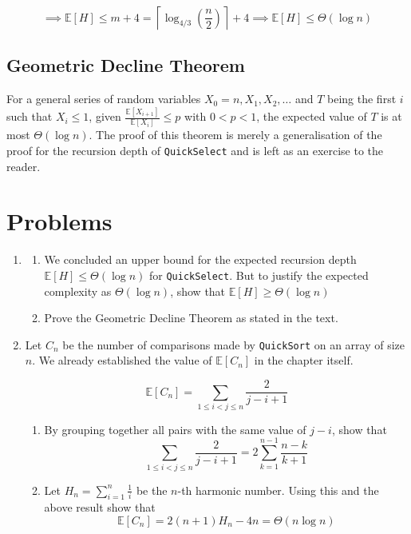\[
\implies
\mathbb E[H]
\le
m+4
=
\left\lceil
\log_{4/3}\!\left(\frac n2\right)
\right\rceil
+4
\implies
\mathbb E[H] \le \Theta(\log n)
\]

\subsection{Geometric Decline Theorem}
For a general series of random variables $X_0=n, X_1, X_2, \ldots$ and $T$ being the first 
$i$ such that $X_i \le 1$, given $\frac{\mathbb E[X_{i+1}]}{\mathbb E[X_{i}]} \le p$ 
with $0<p<1$, the expected value of $T$ is at most $\Theta(\log n)$. The proof of this theorem is merely a 
generalisation of the proof for the recursion depth of \texttt{QuickSelect} and is left as an 
exercise to the reader.

\clearpage
\section{Problems}

\begin{enumerate}
\item[\textbf{1}]
\begin{enumerate}[label=\textbf{(\alph*)}]

\item We concluded an upper bound for the expected recursion depth $\mathbb E[H] \le \Theta(\log n)$ 
for \texttt{QuickSelect}. But to justify the expected complexity as $\Theta(\log n)$, 
show that $\mathbb E[H] \ge \Theta(\log n)$

\item Prove the Geometric Decline Theorem as stated in the text.

\end{enumerate}

\item[\textbf{2}]
Let $C_n$ be the number of comparisons made by \texttt{QuickSort} on an array of size \(n\). 
We already established the value of $\mathbb E[C_n]$ in the chapter itself.

\[
\mathbb E[C_n]=\sum\limits_{1 \le i < j \le n} \frac{2}{j-i+1}
\]

\begin{enumerate}[label=\textbf{(\alph*)}]
\item By grouping together all pairs with the same value of \(j-i\), show that
\[
\sum\limits_{1 \le i < j \le n} \frac{2}{j-i+1}
=
2\sum_{k=1}^{n-1}
\frac{n-k}{k+1}
\]

\item Let $H_n=\sum_{i=1}^{n}\frac1i$ be the \(n\)-th harmonic number. Using this and the 
above result show that
\[
\mathbb E[C_n]
=
2(n+1)H_n-4n = \Theta(n\log n)
\]
\end{enumerate}

\end{enumerate}

